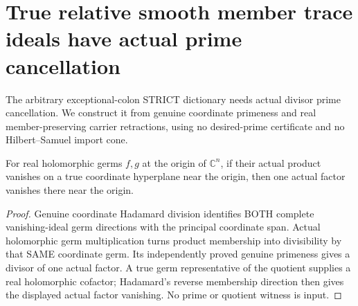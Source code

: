 \section{True relative smooth member trace ideals have actual prime cancellation}

The arbitrary exceptional-colon STRICT dictionary needs actual divisor prime
cancellation. We construct it from genuine coordinate primeness and real
member-preserving carrier retractions, using no desired-prime certificate
and no Hilbert--Samuel import cone.

\begin{lemma}
\label{hir:sharp-actual-coordinate-hyperplane-vanishing-prime}
\leanok
For real holomorphic germs $f,g$ at the origin of $\mathbb C^n$, if their
actual product vanishes on a true coordinate hyperplane near the origin,
then one actual factor vanishes there near the origin.
\end{lemma}
\begin{proof}
Genuine coordinate Hadamard division identifies BOTH complete vanishing-ideal
germ directions with the principal coordinate span. Actual holomorphic germ
multiplication turns product membership into divisibility by that SAME
coordinate germ. Its independently proved genuine primeness gives a divisor
of one actual factor. A true germ representative of the quotient supplies a
real holomorphic cofactor; Hadamard's reverse membership direction then gives
the displayed actual factor vanishing. No prime or quotient witness is input.
\end{proof}

